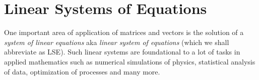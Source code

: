 \section{Linear Systems of Equations}
One important area of application of matrices and vectors is the solution of a \emph{system of linear equations} aka \emph{linear system of equations} (which we shall abbreviate as LSE). Such linear systems are foundational to a lot of tasks in applied mathematics such as numerical simulations of physics, statistical analysis of data, optimization of processes and many more. 




